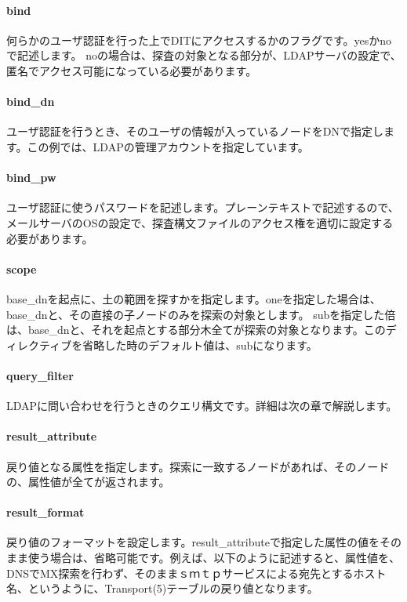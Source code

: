 \paragraph{bind}
何らかのユーザ認証を行った上でDITにアクセスするかのフラグです。yesかnoで記述します。
noの場合は、探査の対象となる部分が、LDAPサーバの設定で、匿名でアクセス可能になっている必要があります。

\paragraph{bind\_dn}
ユーザ認証を行うとき、そのユーザの情報が入っているノードをDNで指定します。この例では、LDAPの管理アカウントを指定しています。

\paragraph{bind\_pw}
ユーザ認証に使うパスワードを記述します。プレーンテキストで記述するので、メールサーバのOSの設定で、探査構文ファイルのアクセス権を適切に設定する必要があります。

\paragraph{scope}
base\_dnを起点に、土の範囲を探すかを指定します。oneを指定した場合は、base\_dnと、その直接の子ノードのみを探索の対象とします。
subを指定した倍は、base\_dnと、それを起点とする部分木全てが探索の対象となります。このディレクティブを省略した時のデフォルト値は、subになります。

\paragraph{query\_filter}
LDAPに問い合わせを行うときのクエリ構文です。詳細は次の章で解説します。

\paragraph{result\_attribute}
戻り値となる属性を指定します。探索に一致するノードがあれば、そのノードの、属性値が全てが返されます。

\paragraph{result\_format}
戻り値のフォーマットを設定します。result\_attributeで指定した属性の値をそのまま使う場合は、省略可能です。例えば、以下のように記述すると、属性値を、DNSでMX探索を行わず、そのままｓｍｔｐサービスによる宛先とするホスト名、というように、Transport(5)テーブルの戻り値となります。

